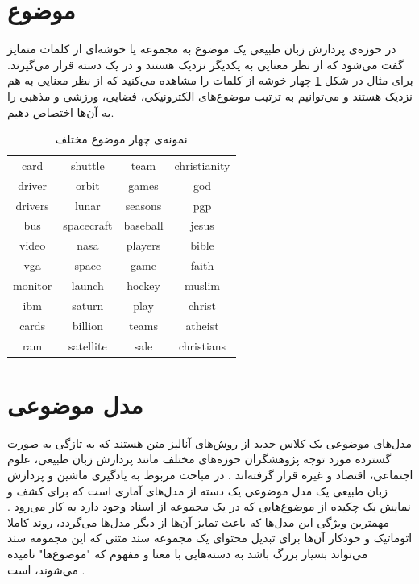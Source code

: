 \section{موضوع}
در حوزه‌ی پردازش زبان طبیعی یک موضوع به مجموعه یا خوشه‌ای
از کلمات متمایز گفت می‌‌شود که از نظر معنایی به یکدیگر نزدیک هستند و در یک دسته قرار می‌‌گیرند. برای مثال در شکل
\ref{chap2-tb1}
چهار خوشه از کلمات را مشاهده می‌‌کنید که از نظر معنایی به هم نزدیک هستند و می‌‌توانیم به ترتیب موضوع‌های الکترونیکی، فضایی، ورزشی و مذهبی را به آن‌ها اختصاص دهیم.
\begin{table}[!h]
	\centering
	\begin{latin}
	\begin{tabular}{|c|c|c|c|}
		\hline
		card 	 & shuttle 		& team 	   & christianity\\
		driver 	 & orbit 		& games    & god\\
		drivers  & lunar 		& seasons  & pgp\\ 
		bus		 & spacecraft 	& baseball & jesus\\ 
		video	 & nasa  		& players  & bible\\ 
		vga		 & space 		& game     & faith\\ 
		monitor  & launch 		& hockey   & muslim\\ 
		ibm   	 & saturn  		& play 	   & christ\\ 
		cards	 & billion		& teams    & atheist\\
		ram    	 & satellite	& sale     & christians\\
		\hline
	\end{tabular}
	\end{latin}
	\caption{نمونه‌ی چهار موضوع مختلف}
	\label{chap2-tb1}
\end{table}

\section{مدل‌ موضوعی}
\label{chap2sec12}
مدل‌های موضوعی یک کلاس جدید از روش‌های آنالیز متن
هستند که به تازگی به صورت گسترده مورد توجه پژوهشگران حوزه‌های مختلف مانند پردازش زبان طبیعی، علوم اجتماعی، اقتصاد و  غیره قرار گرفته‌اند 
\cite{mohr2013introduction}\cite{blei2012probabilistic}.
  در مباحث مربوط به یادگیری ماشین و پردازش زبان طبیعی یک مدل موضوعی یک دسته از مدل‌های آماری است که برای کشف و نمایش یک چکیده
  از موضوع‌هایی که در یک مجموعه از اسناد
   وجود دارد به کار می‌رود 
\cite{zheng2014topic}\cite{blei2003modeling}.
   مهمترین ویژگی این مدل‌ها که باعث تمایز آن‌ها از دیگر مدل‌ها می‌‌گردد، روند کاملا اتوماتیک و خودکار آن‌ها برای تبدیل محتوای یک مجموعه سند متنی که این مجمومه سند می‌‌تواند بسیار بزرگ باشد به دسته‌هایی با معنا و مفهوم که "موضوع‌ها" نامیده می‌‌شوند، است
\cite{mohr2013introduction}.

